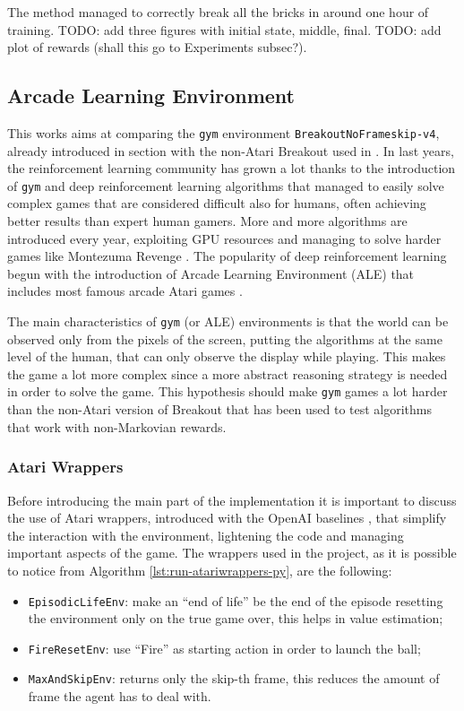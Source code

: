 The method managed to correctly break all the bricks in around one hour of
training. TODO: add three figures with initial state, middle, final.
TODO: add plot of rewards (shall this go to Experiments subsec?).

\subsection{Arcade Learning Environment}
This works aims at comparing the \texttt{gym} environment
\texttt{BreakoutNoFrameskip-v4}, already introduced in section
\label{sec:openaigym} with the non-Atari Breakout used in
\cite{DBLP:journals/corr/abs-1807-06333}. In last years, the reinforcement
learning community has grown a lot thanks to the introduction of \texttt{gym}
and deep reinforcement learning algorithms \cite{mnih2015humanlevel} that
managed to easily solve complex games that are considered difficult also
for humans, often achieving better results than expert human gamers. More
and more algorithms are introduced every year, exploiting GPU resources
and managing to solve harder games like Montezuma Revenge \cite{uber-goexplore}.
The popularity of deep reinforcement learning begun with the introduction of
Arcade Learning Environment (ALE) that includes most
famous arcade Atari games \cite{bellemare13arcade}.

The main characteristics of \texttt{gym} (or ALE) environments is that the
world can be observed only from the pixels of the screen, putting the
algorithms at the same level of the human, that can only observe the display
while playing. This makes the game a lot more complex since a more abstract
reasoning strategy is needed in order to solve the game. This hypothesis should
make \texttt{gym} games a lot harder than the non-Atari version of Breakout
that has been used to test algorithms that work with non-Markovian rewards.

\subsubsection{Atari Wrappers}
Before introducing the main part of the implementation it is important to
discuss the use of Atari wrappers, introduced with the OpenAI baselines
\cite{openai-baselines}, that simplify the interaction with the environment,
lightening the code and managing important aspects of the game.
The wrappers used in the project, as it is possible to notice from Algorithm
\ref{lst:run-atariwrappers-py}, are the following:
\begin{itemize}
    \item \texttt{EpisodicLifeEnv}: make an ``end of life'' be the end
        of the episode resetting the environment only on the true
        game over, this helps in value estimation;
    \item \texttt{FireResetEnv}: use ``Fire'' as starting action in order
        to launch the ball;
    \item \texttt{MaxAndSkipEnv}: returns only the skip-th frame, this
        reduces the amount of frame the agent has to deal with.
\end{itemize}

